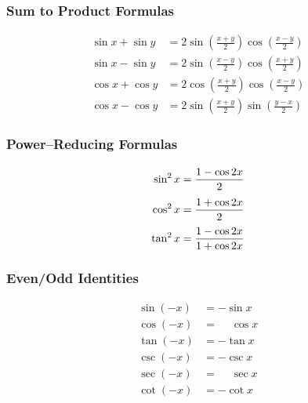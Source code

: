 \noindent%
\begin{minipage}[t]{.44\linewidth}
\subsubsection*{Sum to Product Formulas}
\begin{align*}
\sin x+\sin y &= 2\sin \left(\frac{x+y}2\right)\cos\left(\frac{x-y}2\right) &~\\
\sin x-\sin y &= 2\sin \left(\frac{x-y}2\right)\cos\left(\frac{x+y}2\right) \\
\cos x+\cos y &= 2\cos \left(\frac{x+y}2\right)\cos\left(\frac{x-y}2\right) \\
\cos x-\cos y &= 2\sin \left(\frac{x+y}2\right)\sin\left(\frac{y-x}2\right)
\end{align*}
\end{minipage}%
\begin{minipage}[t]{.3\linewidth}
\subsubsection*{Power--Reducing Formulas}
\begin{align*}
\sin^2 x &= \frac{1-\cos 2x}{2} & \vphantom{\left(\frac11\right)}\\
\cos^2 x &= \frac{1+\cos 2x}{2} & \vphantom{\left(\frac11\right)}\\
\tan^2 x &= \frac{1-\cos 2x}{1+\cos 2x}
\end{align*}
\end{minipage}%
\begin{minipage}[t]{.25\linewidth}
\subsubsection*{Even/Odd Identities}
\begin{align*}
\sin(-x) &= -\sin x &~\\
\cos(-x) &= \phantom{-}\cos x \\
\tan(-x) &= -\tan x \\
\csc(-x) &= -\csc x \\
\sec(-x) &= \phantom{-}\sec x \\
\cot(-x) &= -\cot x
\end{align*}
\end{minipage}

\bigskip

